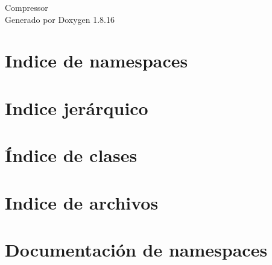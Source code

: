 \let\mypdfximage\pdfximage\def\pdfximage{\immediate\mypdfximage}\documentclass[twoside]{book}
\newcommand{\+}{\discretionary{\mbox{\scriptsize$\hookleftarrow$}}{}{}}
\newcommand{\clearemptydoublepage}{%
  \newpage{\pagestyle{empty}\cleardoublepage}%
}
\begin{document}
\hypersetup{pageanchor=false,
             bookmarksnumbered=true,
             pdfencoding=unicode
            }
\begin{titlepage}
\vspace*{7cm}
\begin{center}%
{\Large Compressor }\\
\vspace*{1cm}
{\large Generado por Doxygen 1.8.16}\\
\end{center}
\end{titlepage}
\clearemptydoublepage
{}
\tableofcontents
\clearemptydoublepage
{}
\hypersetup{pageanchor=true}

\chapter{Indice de namespaces}

\chapter{Indice jerárquico}

\chapter{Índice de clases}

\chapter{Indice de archivos}

\chapter{Documentación de namespaces}



\end{document}
